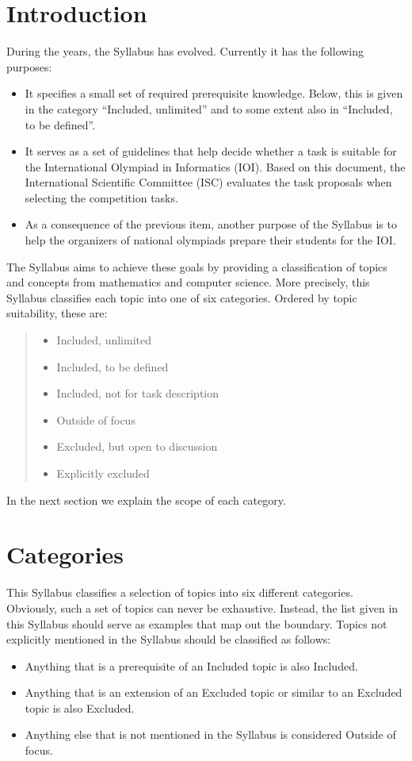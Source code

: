 \documentclass[a4paper,11pt,oneside]{article}
\newcommand{\cmark}{\ding{51}}%
\newcommand{\xmark}{\ding{55}}%
\newcommand{\Cincluded}{{\small\cmark}}
\newcommand{\Cdefine}{{\small\cmark\faFileTextO}}
\newcommand{\Ccodeonly}{{\small\cmark\faFileText}}
\newcommand{\Cnofocus}{{\small\faQuestion}}
\newcommand{\Cexmaybe}{{\small\xmark\faQuestionCircle}}
\newcommand{\Cexcluded}{{\small\xmark}}
\newcommand{\Iincluded}{\item[\hbox to 1.8em{\Cincluded\hfill}]}
\newcommand{\Idefine}{\item[\hbox to 1.8em{\Cdefine\hfill}]}
\newcommand{\Icodeonly}{\item[\hbox to 1.8em{\Ccodeonly\hfill}]}
\newcommand{\Inofocus}{\item[\hbox to 1.8em{\Cnofocus\hfill}]}
\newcommand{\Iexmaybe}{\item[\hbox to 1.8em{\Cexmaybe\hfill}]}
\newcommand{\Iexcluded}{\item[\hbox to 1.8em{\Cexcluded\hfill}]}
\newenvironment{myitemize}{\begin{quote}\begin{itemize}\itemsep 0pt}{\end{itemize}\end{quote}}
\begin{document}
\newpage

\section{Introduction}\label{sec:intro}%

During the years, the Syllabus has evolved. Currently it has the following purposes:

\begin{itemize}
\item
It specifies a small set of required prerequisite knowledge.
Below, this is given in the category ``Included, unlimited''
and to some extent also in ``Included, to be defined''.

\item
It serves as a set of guidelines that help decide whether a task is 
suitable for the International Olympiad in Informatics (IOI).
Based on this document, the International Scientific Committee (ISC)
evaluates the task proposals when selecting the competition tasks.

\item
As a consequence of the previous item, another purpose of the Syllabus 
is to help the organizers of national olympiads prepare
their students for the IOI.

\end{itemize}

The Syllabus aims to achieve these goals by providing a classification of topics and 
concepts from mathematics and computer science. 
More precisely, this Syllabus classifies each topic into one of six categories.
Ordered by topic suitability, these are:

\begin{myitemize}
\Iincluded Included, unlimited
\Idefine   Included, to be defined
\Icodeonly Included, not for task description
\Inofocus  Outside of focus
\Iexmaybe  Excluded, but open to discussion
\Iexcluded Explicitly excluded
\end{myitemize}

\noindent
In the next section we explain the scope of each category.

\newpage

\section{Categories}\label{sec:categories}%

This Syllabus classifies a selection of topics into six different ca\-tegories. 
Obviously, such a set of topics can never be exhaustive.
Instead, the list given in this Syllabus should serve as examples that map out the boundary.
Topics not explicitly mentioned in the Syllabus should be classified as follows:
\begin{itemize}
\itemsep -3pt
\item Anything that is a prerequisite of an Included topic is also Included.
\item Anything that is an extension of an Excluded topic or similar to an Excluded topic is also Excluded.
\item Anything else that is not mentioned in the Syllabus is considered Outside of focus.
\end{itemize}
\end{document}
